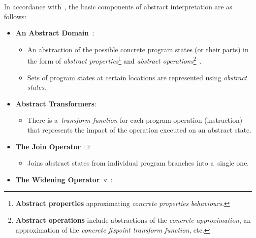 In accordance with~\cite{savAI, ppMarcin2018}, the basic
components of abstract interpretation are as follows:
\begin{itemize}
    \item
        \textbf{An Abstract Domain}~\cite{AICousotWeb}:

        \begin{itemize}
            \item
                An abstraction of the possible concrete program states
                (or their parts) in the form of \emph{abstract
                properties}\footnote{\textbf{Abstract properties}
                approximating \emph{concrete properties behaviours}.}
                and \emph{abstract operations}\footnote{\textbf{Abstract
                operations} include abstractions of the \emph{concrete
                approximation}, an approximation of the \emph{concrete
                fixpoint transform function},
                etc.}~\cite{AIBasedFormalMethodsCousot}.

            \item
                Sets of program states at certain locations are represented
                using \emph{abstract states}.
        \end{itemize}

    \item
        \textbf{Abstract Transformers}:

        \begin{itemize}
            \item
                There is a~\emph{transform function} for each program
                operation (instruction) that represents the impact
                of the operation executed on an abstract state.
        \end{itemize}

    \item
        \textbf{The Join Operator}~$ \sqcup $:

        \begin{itemize}
            \item
                Joins abstract states from individual program branches into
                a~single one.
        \end{itemize}

    \item
        \textbf{The Widening
        Operator~$ \triangledown $}~\cite{programAnalysisNielson,
        wideningNarrowingCousot, savAI}:


\end{itemize}
